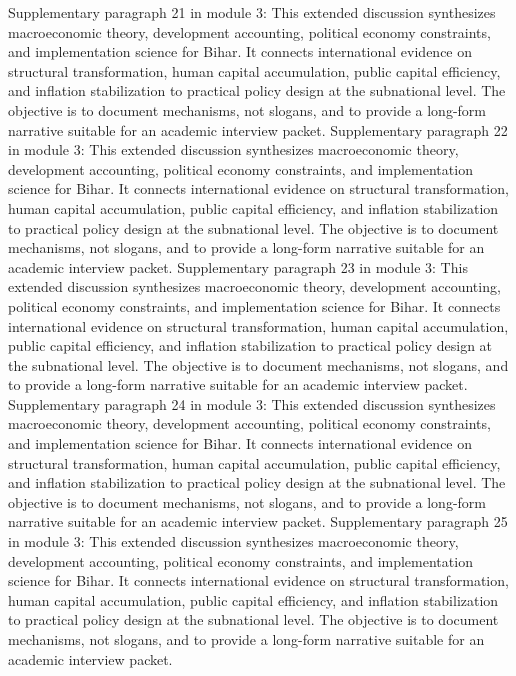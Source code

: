 \documentclass[preprint,12pt]{elsarticle}
\begin{document}
Supplementary paragraph 21 in module 3: This extended discussion synthesizes macroeconomic theory, development accounting, political economy constraints, and implementation science for Bihar. It connects international evidence on structural transformation, human capital accumulation, public capital efficiency, and inflation stabilization to practical policy design at the subnational level. The objective is to document mechanisms, not slogans, and to provide a long-form narrative suitable for an academic interview packet.
Supplementary paragraph 22 in module 3: This extended discussion synthesizes macroeconomic theory, development accounting, political economy constraints, and implementation science for Bihar. It connects international evidence on structural transformation, human capital accumulation, public capital efficiency, and inflation stabilization to practical policy design at the subnational level. The objective is to document mechanisms, not slogans, and to provide a long-form narrative suitable for an academic interview packet.
Supplementary paragraph 23 in module 3: This extended discussion synthesizes macroeconomic theory, development accounting, political economy constraints, and implementation science for Bihar. It connects international evidence on structural transformation, human capital accumulation, public capital efficiency, and inflation stabilization to practical policy design at the subnational level. The objective is to document mechanisms, not slogans, and to provide a long-form narrative suitable for an academic interview packet.
Supplementary paragraph 24 in module 3: This extended discussion synthesizes macroeconomic theory, development accounting, political economy constraints, and implementation science for Bihar. It connects international evidence on structural transformation, human capital accumulation, public capital efficiency, and inflation stabilization to practical policy design at the subnational level. The objective is to document mechanisms, not slogans, and to provide a long-form narrative suitable for an academic interview packet.
Supplementary paragraph 25 in module 3: This extended discussion synthesizes macroeconomic theory, development accounting, political economy constraints, and implementation science for Bihar. It connects international evidence on structural transformation, human capital accumulation, public capital efficiency, and inflation stabilization to practical policy design at the subnational level. The objective is to document mechanisms, not slogans, and to provide a long-form narrative suitable for an academic interview packet.
\end{document}
